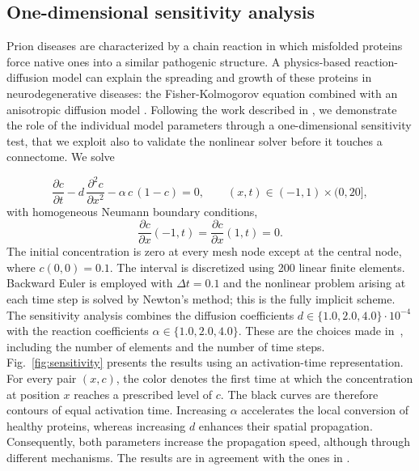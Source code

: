 \subsection{One-dimensional sensitivity analysis}
\label{sec:onedim}

Prion diseases are characterized by a chain reaction in which misfolded proteins force native ones into a similar pathogenic structure. A physics-based reaction-diffusion model can explain the spreading and growth of these proteins in neurodegenerative diseases: the Fisher-Kolmogorov equation combined with an anisotropic diffusion model \cite{weickenmeier2019prion,cortiFisherKolmogorovGraphs,fornari2019prion}. Following the work described in \cite{weickenmeier2019prion}, we demonstrate the role of the individual model parameters through a one-dimensional sensitivity test, that we exploit also to validate the nonlinear solver before it touches a connectome. We solve

\begin{equation}
\frac{\partial c}{\partial t} - d\,\frac{\partial^2 c}{\partial x^2}
  - \alpha\,c\,(1-c) = 0,
\qquad (x,t) \in (-1,1) \times (0,20],
\label{eq:onedim}
\end{equation}
with homogeneous Neumann boundary conditions,
\[
\frac{\partial c}{\partial x}(-1,t) = \frac{\partial c}{\partial x}(1,t) = 0 .
\]
The initial concentration is zero at every mesh node except at the central node, where $c(0,0)=0.1$. The interval is discretized using 200 linear finite elements. Backward Euler is employed with $\Delta t = 0.1$ and the nonlinear problem arising at each time step is solved by Newton's method; this is the fully implicit scheme. The sensitivity analysis combines the diffusion coefficients $d \in \{1.0, 2.0, 4.0\}\cdot10^{-4}$ with the reaction coefficients $\alpha \in \{1.0,2.0,4.0\}$. These are the choices made in~\cite{weickenmeier2019prion}, including the number of elements and the number of time steps.
\noindent
Fig.~\ref{fig:sensitivity} presents the results using an activation-time representation. For every pair $(x,c)$, the color denotes the first time at which the concentration at position $x$ reaches a prescribed level of $c$. The black curves are therefore contours of equal activation time.
Increasing $\alpha$ accelerates the local conversion of healthy proteins, whereas increasing $d$ enhances their spatial propagation. Consequently, both parameters increase the propagation speed, although through different mechanisms. The results are in agreement with the ones in \cite{weickenmeier2019prion}.

